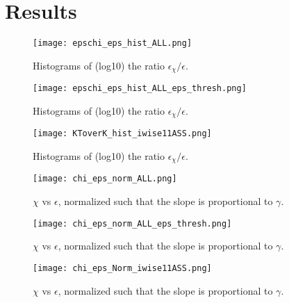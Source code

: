 \documentclass[11pt]{article}
\begin{document}
%
%
%
%


\section{Results}




\begin{figure}[htbp]
\texttt{[image: epschi\_eps\_hist\_ALL.png]}
\caption{Histograms of (log10) the ratio $\epsilon_{\chi}/\epsilon$.}
\label{}
\end{figure}


\begin{figure}[htbp]
\texttt{[image: epschi\_eps\_hist\_ALL\_eps\_thresh.png]}
\caption{Histograms of (log10) the ratio $\epsilon_{\chi}/\epsilon$.}
\label{}
\end{figure}




\begin{figure}[htbp]
\texttt{[image: KToverK\_hist\_iwise11ASS.png]}
\caption{Histograms of (log10) the ratio $\epsilon_{\chi}/\epsilon$.}
\label{}
\end{figure}






\begin{figure}[htbp]
\texttt{[image: chi\_eps\_norm\_ALL.png]}
\caption{$\chi$ vs $\epsilon$, normalized such that the slope is proportional to $\gamma$.}
\label{}
\end{figure}


\begin{figure}[htbp]
\texttt{[image: chi\_eps\_norm\_ALL\_eps\_thresh.png]}
\caption{$\chi$ vs $\epsilon$, normalized such that the slope is proportional to $\gamma$.}
\label{}
\end{figure}


\begin{figure}[htbp]
\texttt{[image: chi\_eps\_Norm\_iwise11ASS.png]}
\caption{$\chi$ vs $\epsilon$, normalized such that the slope is proportional to $\gamma$.}
\label{}
\end{figure}
\end{document}
